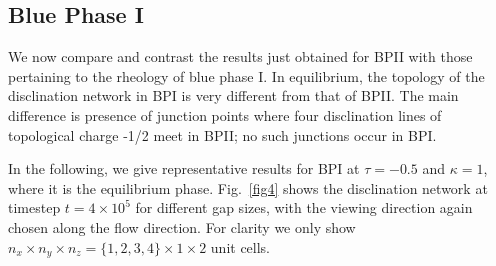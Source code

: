 \documentclass[12pt,twoside]{iopart}
\newcommand{\ex}[1]{\times10^{#1}}
\begin{document}
\subsection{Blue Phase I}\label{sec_bpi}

We now compare and contrast the results just obtained for BPII with those
pertaining to the rheology of blue phase I. In equilibrium, the topology
of the disclination network in BPI is very different from that of BPII.
The main difference is presence of junction points where four disclination
lines of topological charge -1/2 meet in BPII; no such junctions occur in BPI.

In the following, we give representative results for BPI at $\tau=-0.5$
and $\kappa=1$, where it is the equilibrium phase.
Fig.~\ref{fig4} shows the disclination network at timestep $t=4\ex{5}$
for different gap sizes, with the viewing direction again chosen along
the flow direction.
For clarity we only show $n_x \times n_y \times n_z=\{1,2,3,4\}\times1\times2$
unit cells.
\end{document}
